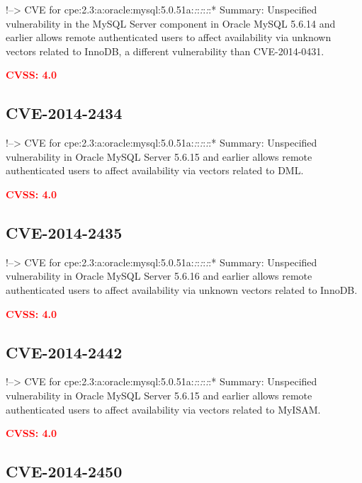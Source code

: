 \documentclass[a4paper, 12pt]{article}
\begin{document}
!--\textgreater{} CVE for
cpe:2.3:a:oracle:mysql:5.0.51a:\emph{:}:\emph{:}:\emph{:}:* Summary:
Unspecified vulnerability in the MySQL Server component in Oracle MySQL
5.6.14 and earlier allows remote authenticated users to affect
availability via unknown vectors related to InnoDB, a different
vulnerability than CVE-2014-0431.

\textbf{\textcolor{red}{CVSS: 4.0}}

\hypertarget{cve-2014-2434}{%
\subsection{CVE-2014-2434}\label{cve-2014-2434}}

!--\textgreater{} CVE for
cpe:2.3:a:oracle:mysql:5.0.51a:\emph{:}:\emph{:}:\emph{:}:* Summary:
Unspecified vulnerability in Oracle MySQL Server 5.6.15 and earlier
allows remote authenticated users to affect availability via vectors
related to DML.

\textbf{\textcolor{red}{CVSS: 4.0}}

\hypertarget{cve-2014-2435}{%
\subsection{CVE-2014-2435}\label{cve-2014-2435}}

!--\textgreater{} CVE for
cpe:2.3:a:oracle:mysql:5.0.51a:\emph{:}:\emph{:}:\emph{:}:* Summary:
Unspecified vulnerability in Oracle MySQL Server 5.6.16 and earlier
allows remote authenticated users to affect availability via unknown
vectors related to InnoDB.

\textbf{\textcolor{red}{CVSS: 4.0}}

\hypertarget{cve-2014-2442}{%
\subsection{CVE-2014-2442}\label{cve-2014-2442}}

!--\textgreater{} CVE for
cpe:2.3:a:oracle:mysql:5.0.51a:\emph{:}:\emph{:}:\emph{:}:* Summary:
Unspecified vulnerability in Oracle MySQL Server 5.6.15 and earlier
allows remote authenticated users to affect availability via vectors
related to MyISAM.

\textbf{\textcolor{red}{CVSS: 4.0}}

\hypertarget{cve-2014-2450}{%
\subsection{CVE-2014-2450}\label{cve-2014-2450}}
\end{document}
